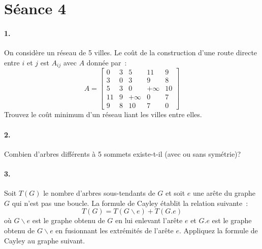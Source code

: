 \section{Séance 4}

\paragraph{1. } On considère un réseau de 5 villes. Le coût de la construction d'une route directe entre $i$ et $j$ est $A_{ij}$ avec $A$ donnée par~:
\[
  A = \begin{bmatrix}
    0 & 3 & 5 & 11 & 9 \\
    3 & 0 & 3 & 9 & 8 \\
    5 & 3 & 0 & +\infty & 10 \\
    11 & 9 & +\infty & 0 & 7 \\
    9 & 8 & 10 & 7 & 0
  \end{bmatrix}
\]
Trouvez le coût minimum d'un réseau liant les villes entre elles.

\paragraph{2. } Combien d'arbres différents à 5 sommets existe-t-il (avec ou sans symétrie)?

\paragraph{3. } Soit $T(G)$ le nombre d'arbres sous-tendants de $G$ et soit $e$ une arête du graphe $G$ qui n'est pas une boucle. La formule de Cayley établit la relation suivante~:
\[
  T(G) = T(G \backslash e) + T(G.e)
\]
où $G \backslash e$ est le graphe obtenu de $G$ en lui enlevant l'arête $e$ et $G.e$ est le graphe obtenu de $G \backslash e$ en fusionnant les extrémités de l'arête $e$. Appliquez la formule de Cayley au graphe suivant.

\begin{figure}[h!]
  \begin{center}
  \end{center}
\end{figure}
\vspace{-.5cm}

